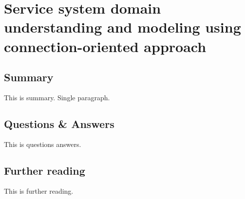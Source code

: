 \section{Service system domain understanding and modeling using connection-oriented approach}

\subsection{Summary}
This is summary. Single paragraph.

\subsection{Questions \& Answers}
This is questions answers.

\subsection{Further reading}
This is further reading.
